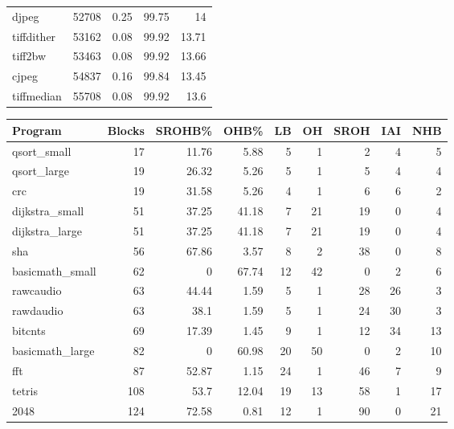 \begin{tabular}{lrrrr}
 djpeg           &   52708 &   0.25 &        99.75 &   14    \\
 tiffdither      &   53162 &   0.08 &        99.92 &   13.71 \\
 tiff2bw         &   53463 &   0.08 &        99.92 &   13.66 \\
 cjpeg           &   54837 &   0.16 &        99.84 &   13.45 \\
 tiffmedian      &   55708 &   0.08 &        99.92 &   13.6  \\
\hline
\end{tabular}\begin{tabular}{lrrrrrrrr}
\hline
 Program         &   Blocks &   SROHB\% &   OHB\% &   LB &   OH &   SROH &   IAI &   NHB \\
\hline
 qsort\_small     &       17 &    11.76 &   5.88 &    5 &    1 &      2 &     4 &     5 \\
 qsort\_large     &       19 &    26.32 &   5.26 &    5 &    1 &      5 &     4 &     4 \\
 crc             &       19 &    31.58 &   5.26 &    4 &    1 &      6 &     6 &     2 \\
 dijkstra\_small  &       51 &    37.25 &  41.18 &    7 &   21 &     19 &     0 &     4 \\
 dijkstra\_large  &       51 &    37.25 &  41.18 &    7 &   21 &     19 &     0 &     4 \\
 sha             &       56 &    67.86 &   3.57 &    8 &    2 &     38 &     0 &     8 \\
 basicmath\_small &       62 &     0    &  67.74 &   12 &   42 &      0 &     2 &     6 \\
 rawcaudio       &       63 &    44.44 &   1.59 &    5 &    1 &     28 &    26 &     3 \\
 rawdaudio       &       63 &    38.1  &   1.59 &    5 &    1 &     24 &    30 &     3 \\
 bitcnts         &       69 &    17.39 &   1.45 &    9 &    1 &     12 &    34 &    13 \\
 basicmath\_large &       82 &     0    &  60.98 &   20 &   50 &      0 &     2 &    10 \\
 fft             &       87 &    52.87 &   1.15 &   24 &    1 &     46 &     7 &     9 \\
 tetris          &      108 &    53.7  &  12.04 &   19 &   13 &     58 &     1 &    17 \\
 2048            &      124 &    72.58 &   0.81 &   12 &    1 &     90 &     0 &    21 \\

\end{tabular}

